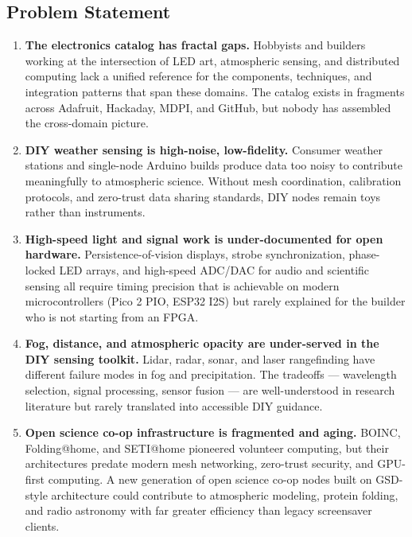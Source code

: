 \documentclass[11pt,letterpaper]{article}
\begin{document}
\subsection{Problem Statement}

\begin{enumerate}
  \item \textbf{The electronics catalog has fractal gaps.} Hobbyists and builders working at the intersection of LED art, atmospheric sensing, and distributed computing lack a unified reference for the components, techniques, and integration patterns that span these domains. The catalog exists in fragments across Adafruit, Hackaday, MDPI, and GitHub, but nobody has assembled the cross-domain picture.

  \item \textbf{DIY weather sensing is high-noise, low-fidelity.} Consumer weather stations and single-node Arduino builds produce data too noisy to contribute meaningfully to atmospheric science. Without mesh coordination, calibration protocols, and zero-trust data sharing standards, DIY nodes remain toys rather than instruments.

  \item \textbf{High-speed light and signal work is under-documented for open hardware.} Persistence-of-vision displays, strobe synchronization, phase-locked LED arrays, and high-speed ADC/DAC for audio and scientific sensing all require timing precision that is achievable on modern microcontrollers (Pico 2 PIO, ESP32 I2S) but rarely explained for the builder who is not starting from an FPGA.

  \item \textbf{Fog, distance, and atmospheric opacity are under-served in the DIY sensing toolkit.} Lidar, radar, sonar, and laser rangefinding have different failure modes in fog and precipitation. The tradeoffs --- wavelength selection, signal processing, sensor fusion --- are well-understood in research literature but rarely translated into accessible DIY guidance.

  \item \textbf{Open science co-op infrastructure is fragmented and aging.} BOINC, Folding@home, and SETI@home pioneered volunteer computing, but their architectures predate modern mesh networking, zero-trust security, and GPU-first computing. A new generation of open science co-op nodes built on GSD-style architecture could contribute to atmospheric modeling, protein folding, and radio astronomy with far greater efficiency than legacy screensaver clients.
\end{enumerate}
\end{document}
